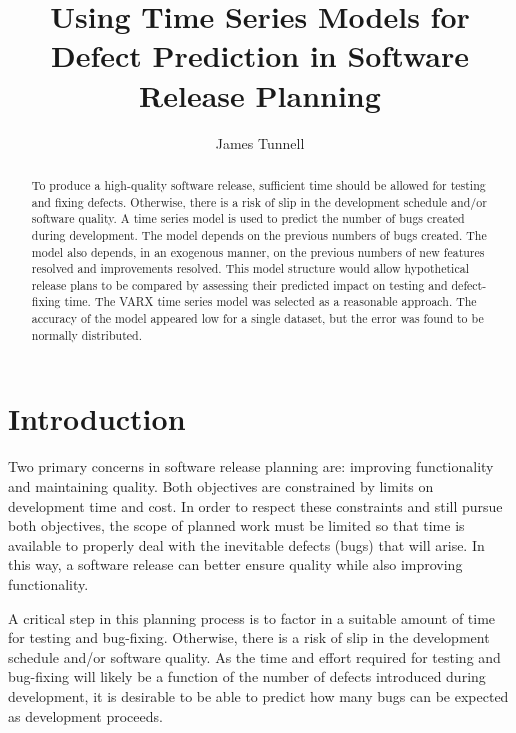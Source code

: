\documentclass[letterpaper]{report}
\begin{document}
\title{Using Time Series Models for Defect Prediction in Software Release Planning}
\author{James Tunnell}
\maketitle

\begin{abstract}
To produce a high-quality software release, sufficient time should be allowed for testing and fixing defects. Otherwise, there is a risk of slip in the development schedule and/or software quality. A time series model is used to predict the number of bugs created during development. The model depends on the previous numbers of bugs created. The model also depends, in an exogenous manner, on the previous numbers of new features resolved and improvements resolved. This model structure would allow hypothetical release plans to be compared by assessing their predicted impact on testing and defect-fixing time. The VARX time series model was selected as a reasonable approach. The accuracy of the model appeared low for a single dataset, but the error was found to be normally distributed.
\end{abstract}

\pagebreak
\setcounter{tocdepth}{2}
\tableofcontents

\listoffigures
\listoftables

\pagebreak
\chapter{Introduction}
Two primary concerns in software release planning are: improving functionality and maintaining quality. Both objectives are constrained by limits on development time and cost. In order to respect these constraints and still pursue both objectives, the scope of planned work must be limited so that time is available to properly deal with the inevitable defects (bugs) that will arise. In this way, a software release can better ensure quality while also improving functionality.

A critical step in this planning process is to factor in a suitable amount of time for testing and bug-fixing. Otherwise, there is a risk of slip in the development schedule and/or software quality. As the time and effort required for testing and bug-fixing will likely be a function of the number of defects introduced during development, it is desirable to be able to predict how many bugs can be expected as development proceeds.
\end{document}
